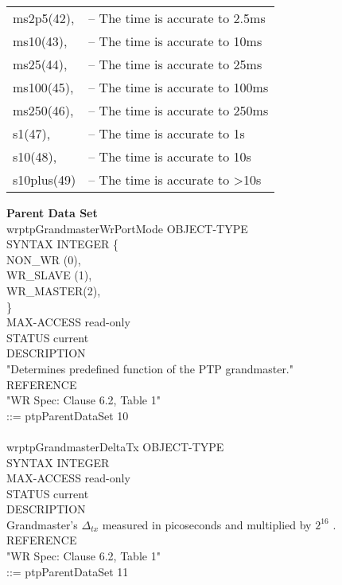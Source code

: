 {\begin{table}[!ht]
\begin{tabular}{ l l }
ms2p5(42),  & -- The time is accurate to 2.5ms \\
ms10(43),   & -- The time is accurate to 10ms \\
ms25(44),   & -- The time is accurate to 25ms \\
ms100(45),  & -- The time is accurate to 100ms \\
ms250(46),  & -- The time is accurate to 250ms \\
s1(47),     & -- The time is accurate to 1s \\
s10(48),    & -- The time is accurate to 10s \\
s10plus(49) & -- The time is accurate to >10s \\
\end{tabular}
\end{table}
}
\newline
\vspace{5 mm}
\textbf{Parent Data Set}  \\
\vspace{5 mm}
wrptpGrandmasterWrPortMode OBJECT-TYPE \\
SYNTAX INTEGER \{ \\
\tab NON\_WR (0), \\
\tab WR\_SLAVE (1), \\
\tab WR\_MASTER(2), \\
\} \\
MAX-ACCESS read-only \\
STATUS current \\
DESCRIPTION \\
"Determines predefined function of the PTP grandmaster."  \\
REFERENCE \\
"WR Spec: Clause 6.2, Table 1" \\
::= { ptpParentDataSet 10 } \\
\\
wrptpGrandmasterDeltaTx OBJECT-TYPE \\
SYNTAX INTEGER \\
MAX-ACCESS read-only \\
STATUS current \\
DESCRIPTION \\
Grandmaster's $\Delta_{tx}$ measured in picoseconds and multiplied by $2^{16}$ .
REFERENCE  \\
"WR Spec: Clause 6.2, Table 1" \\
::= { ptpParentDataSet 11 } \\
\\
